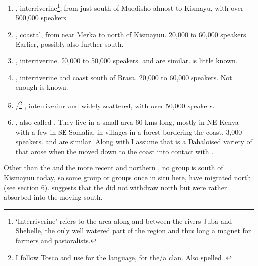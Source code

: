 \documentclass[output=paper
,newtxmath
,modfonts
,nonflat]{langsci/langscibook}
\begin{document}
\begin{enumerate}
\item  {}, interriverine\footnote{‘Interriverine’ refers to the area along and between the rivers Juba and Shebelle, the only well watered part of the region and thus long a magnet for farmers and pastoralists.}, from just south of Muqdisho almost to Kismayu, with over 500,000 speakers

\item {}, coastal, from near Merka to north of Kismayuu. 20,000 to 60,000 speakers. Earlier, possibly also further south. 

\item {}, interriverine. 20,000 to 50,000 speakers.  and  are similar.  is little known. 

\item {}, interriverine and coast south of Brava. 20,000 to 60,000 speakers. Not enough is known.

\item {}/\footnote{I follow Tosco and use  for the language,  for the/a clan. Also spelled .} , interriverine and widely scattered, with over 50,000 speakers.

\item {}, also called . They live in a small area 60 kms long, mostly in NE Kenya with a few in SE Somalia, in villages in a forest bordering the coast. 3,000 speakers.  and  are similar. Along with \citet{Tosco1994} I assume that  is a Dahaloised variety of  that arose when the  moved down to the coast into contact with .

\end{enumerate}

Other than the  and the more recent  and northern , no   group is south of Kismayuu today, so some group or groups once in situ here, have migrated north (see section 6). \citet{Ali1985} suggests that the  did not withdraw north but were rather absorbed into the  moving south. 
\end{document}
